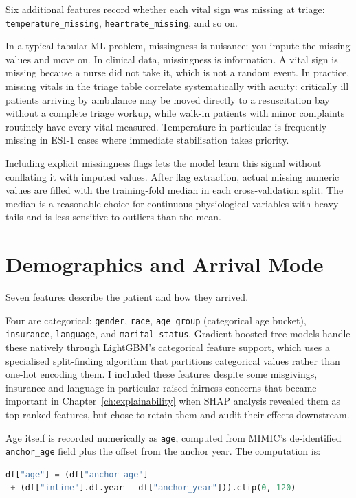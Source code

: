 Six additional features record whether each vital sign was missing at triage: \texttt{temperature\_missing}, \texttt{heartrate\_missing}, and so on.

In a typical tabular ML problem, missingness is nuisance: you impute the missing values and move on. In clinical data, missingness is information. A vital sign is missing because a nurse did not take it, which is not a random event. In practice, missing vitals in the triage table correlate systematically with acuity: critically ill patients arriving by ambulance may be moved directly to a resuscitation bay without a complete triage workup, while walk-in patients with minor complaints routinely have every vital measured. Temperature in particular is frequently missing in ESI-1 cases where immediate stabilisation takes priority.

Including explicit missingness flags lets the model learn this signal without conflating it with imputed values. After flag extraction, actual missing numeric values are filled with the training-fold median in each cross-validation split. The median is a reasonable choice for continuous physiological variables with heavy tails and is less sensitive to outliers than the mean.

\section{Demographics and Arrival Mode}

Seven features describe the patient and how they arrived.

Four are categorical: \texttt{gender}, \texttt{race}, \texttt{age\_group} (categorical age bucket), \texttt{insurance}, \texttt{language}, and \texttt{marital\_status}. Gradient-boosted tree models handle these natively through LightGBM's categorical feature support, which uses a specialised split-finding algorithm that partitions categorical values rather than one-hot encoding them. I included these features despite some misgivings, insurance and language in particular raised fairness concerns that became important in Chapter~\ref{ch:explainability} when SHAP analysis revealed them as top-ranked features, but chose to retain them and audit their effects downstream.

Age itself is recorded numerically as \texttt{age}, computed from MIMIC's de-identified \texttt{anchor\_age} field plus the offset from the anchor year. The computation is:
\begin{lstlisting}[language=Python]
df["age"] = (df["anchor_age"]
 + (df["intime"].dt.year - df["anchor_year"])).clip(0, 120)
\end{lstlisting}

